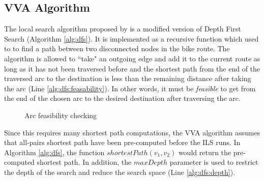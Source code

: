 \documentclass[11pt]{article}
\newcommand{\td}{\todo[inline]}
\begin{document}
\subsection{VVA Algorithm}
The local search algorithm proposed by \citeauthor{verbeeck2014extension} is a modified version of Depth First Search (Algorithm \ref{alg:dfs}). It is implemented as a recursive function which used to to find a path between two disconnected nodes in the bike route. The algorithm is allowed to ``take" an outgoing edge and add it to the current route as long as it has not been traversed before and the shortest path from the end of the traversed arc to the destination is less than the remaining distance after taking the arc (Line \ref{alg:dfs:feasability}). In other words, it must be \emph{feasible} to get from the end of the chosen arc to the desired destination after traversing the arc. 

\begin{figure}
\begin{center}
\end{center}
\caption{Arc feasibility checking}
\end{figure}


Since this requires many shortest path computations, the VVA algorithm assumes that all-pairs shortest path have been pre-computed before the ILS runs. In Algorithm \ref{alg:dfs}, the function $shortestPath(v_1, v_2)$ would return the pre-computed shortest path. In addition, the $maxDepth$ parameter is used to restrict the depth of the search and reduce the search space (Line \ref{alg:dfs:depth}).
\end{document}

